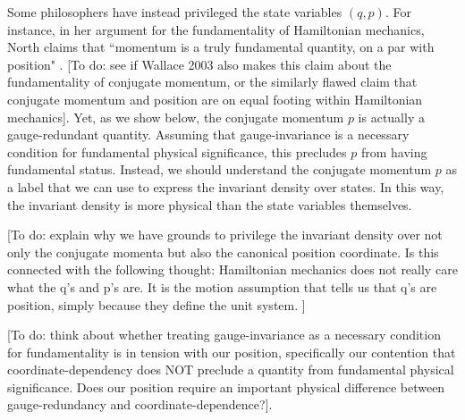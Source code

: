 \documentclass[letterpaper]{article}
\begin{document}
Some philosophers have instead privileged the state variables $(q, p)$. For instance, in her argument for the fundamentality of Hamiltonian mechanics, North claims that ``momentum is a truly fundamental quantity, on a par with position" \parencites*[77]{North}. [To do: see if Wallace 2003 also makes this claim about the fundamentality of conjugate momentum, or the similarly flawed claim that conjugate momentum and position are on equal footing within Hamiltonian mechanics]. Yet, as we show below, the conjugate momentum $p$ is actually a gauge-redundant quantity. Assuming that gauge-invariance is a necessary condition for fundamental physical significance, this precludes $p$ from having fundamental status. Instead, we should understand the conjugate momentum $p$ as a label that we can use to express the invariant density over states. In this way, the invariant density is more physical than the state variables themselves. 

[To do: explain why we have grounds to privilege the invariant density over not only the conjugate momenta but also the canonical position coordinate. Is this connected with the following thought: Hamiltonian mechanics does not really care what the q's and p's are. It is the motion assumption that tells us that q's are position, simply because they define the unit system. ]

[To do: think about whether treating gauge-invariance as a necessary condition for fundamentality is in tension with our position, specifically our contention that coordinate-dependency does NOT preclude a quantity from fundamental physical significance. Does our position require an important physical difference between gauge-redundancy and coordinate-dependence?].
\end{document}
